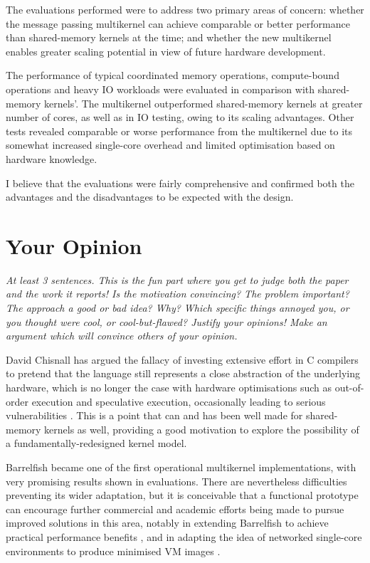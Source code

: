 \documentclass[11pt]{article}
\begin{document}
The evaluations performed were to address two primary areas of concern: whether the message passing multikernel can achieve comparable or better performance than shared-memory kernels at the time; and whether the new multikernel enables greater scaling potential in view of future hardware development. 

The performance of typical coordinated memory operations, compute-bound operations and heavy IO workloads were evaluated in comparison with shared-memory kernels'. The multikernel outperformed shared-memory kernels at greater number of cores, as well as in IO testing, owing to its scaling advantages. Other tests revealed comparable or worse performance from the multikernel due to its somewhat increased single-core overhead and limited optimisation based on hardware knowledge. 

I believe that the evaluations were fairly comprehensive and confirmed both the advantages and the disadvantages to be expected with the design.

\section*{Your Opinion}
\textsl{At least 3 sentences. This is the fun part where you get to judge both the paper and the work it reports! Is the motivation convincing? The problem important? The approach a good or bad idea?  Why? Which specific things annoyed you, or you thought were cool, or cool-but-flawed? Justify your opinions! Make an argument which will convince others of your opinion.}

David Chisnall has argued the fallacy of investing extensive effort in C compilers to pretend that the language still represents a close abstraction of the underlying hardware, which is no longer the case with hardware optimisations such as out-of-order execution and speculative execution, occasionally leading to serious vulnerabilities \cite{kocher2018spectre}. This is a point that can and has been well made for shared-memory kernels as well, providing a good motivation to explore the possibility of a fundamentally-redesigned kernel model.

Barrelfish became one of the first operational multikernel implementations, with very promising results shown in evaluations. There are nevertheless difficulties preventing its wider adaptation, but it is conceivable that a functional prototype can encourage further commercial and academic efforts being made to pursue improved solutions in this area, notably in extending Barrelfish to achieve practical performance benefits \cite{peter2016arrakis}, and in adapting the idea of networked single-core environments to produce minimised VM images \cite{madhavapeddy2013unikernels}.
\end{document}
